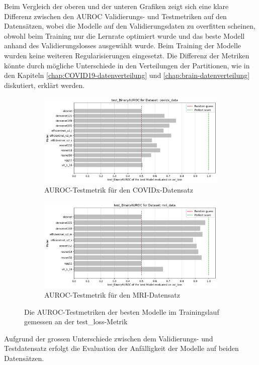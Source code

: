 Beim Vergleich der oberen und der unteren Grafiken zeigt sich eine klare Differenz zwischen den AUROC Validierungs- und Testmetriken auf den Datensätzen, wobei die Modelle auf den Validierungsdaten zu overfitten scheinen, obwohl beim Training nur die Lernrate optimiert wurde und das beste Modell anhand des Validierungslosses ausgewählt wurde. Beim Training der Modelle wurden keine weiteren Regularisierungen eingesetzt. Die Differenz der Metriken könnte durch mögliche Unterschiede in den Verteilungen der Partitionen, wie in den Kapiteln \ref{chap:COVID19-datenverteilung} und \ref{chap:brain-datenverteilung} diskutiert, erklärt werden. 

\begin{figure}[ht!]
    \centering
    \begin{subfigure}{0.5\linewidth}
        \centering
        \includegraphics[height=0.5\linewidth]{01-images/05-resultate/test_binaryAUROC_COVIDX.png}
        \caption{AUROC-Testmetrik für den COVIDx-Datensatz}
    \end{subfigure}\hfill%
    \begin{subfigure}{0.5\linewidth}
        \centering
        \includegraphics[height=0.5\linewidth]{01-images/05-resultate/test_binaryAUROC_MRI.png}
        \caption{AUROC-Testmetrik für den MRI-Datensatz}
    \end{subfigure}
    \caption{Die AUROC-Testmetriken der besten Modelle im Trainingslauf gemessen an der test\_loss-Metrik}
\end{figure}

Aufgrund der grossen Unterschiede zwischen dem Validierungs- und Testdatensatz erfolgt die Evaluation der Anfälligkeit der Modelle auf beiden Datensätzen.

\newpage

